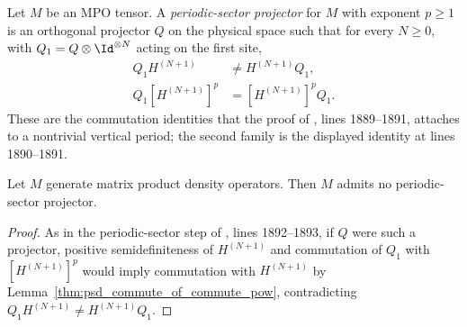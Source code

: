 \begin{definition}
    \label{def:mpdo_periodic_sector_projector}
    \leanok
    Let $M$ be an MPO tensor. A \emph{periodic-sector projector} for $M$
    with exponent $p\ge 1$ is an orthogonal projector $Q$ on
    the physical space such that for every $N\ge 0$, with
    $Q_1=Q\otimes\Id^{\otimes N}$ acting on the first site,
    \begin{align}
        Q_1H^{(N+1)}
         & \ne H^{(N+1)}Q_1,
        \label{eq:mpdo_periodic_noncommute} \\
        Q_1[H^{(N+1)}]^p
         & =[H^{(N+1)}]^pQ_1.
        \label{eq:mpdo_periodic_commute_power}
    \end{align}
    These are the commutation identities that the proof of
    \cite[Proposition~4.13]{Cirac2016MPDO_arXiv}, lines 1889--1891, attaches
    to a nontrivial vertical period; the second family is the displayed
    identity at lines 1890--1891.
\end{definition}

\begin{lemma}
    \label{thm:mpdo_no_periodic_sector_projector}
    \leanok
    Let $M$ generate matrix product density operators. Then $M$ admits no
    periodic-sector projector.
\end{lemma}

\begin{proof}
    \leanok
    As in the periodic-sector step of
    \cite[Proposition~4.13]{Cirac2016MPDO_arXiv}, lines 1892--1893, if $Q$
    were such a projector, positive semidefiniteness of $H^{(N+1)}$ and
    commutation of $Q_1$ with $[H^{(N+1)}]^p$ would imply commutation with
    $H^{(N+1)}$ by Lemma~\ref{thm:psd_commute_of_commute_pow},
    contradicting $Q_1H^{(N+1)}\ne H^{(N+1)}Q_1$.
\end{proof}

